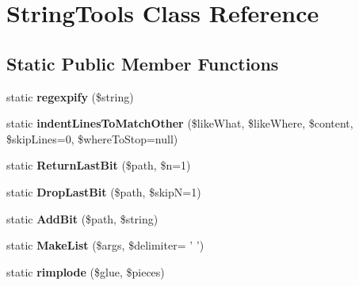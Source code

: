 \hypertarget{class_tools_1_1_string_tools}{
\section{\-String\-Tools \-Class \-Reference}
\label{class_tools_1_1_string_tools}
}
\subsection*{\-Static \-Public \-Member \-Functions}
\begin{DoxyCompactItemize}
\item 
\hypertarget{class_tools_1_1_string_tools_aba588c7c4205b677d3afd1f803d2ab4b}{
static {\bfseries regexpify} (\$string)}
\label{class_tools_1_1_string_tools_aba588c7c4205b677d3afd1f803d2ab4b}

\item 
\hypertarget{class_tools_1_1_string_tools_ae93d3bc0b3706df05cb47fff89b08e37}{
static {\bfseries indent\-Lines\-To\-Match\-Other} (\$like\-What, \$like\-Where, \$content, \$skip\-Lines=0, \$where\-To\-Stop=null)}
\label{class_tools_1_1_string_tools_ae93d3bc0b3706df05cb47fff89b08e37}

\item 
\hypertarget{class_tools_1_1_string_tools_a29d6807e1d8f4e1ee335baf0d0fd1d1b}{
static {\bfseries \-Return\-Last\-Bit} (\$path, \$n=1)}
\label{class_tools_1_1_string_tools_a29d6807e1d8f4e1ee335baf0d0fd1d1b}

\item 
\hypertarget{class_tools_1_1_string_tools_af7b82890bac23b74e75bddb69aefc560}{
static {\bfseries \-Drop\-Last\-Bit} (\$path, \$skip\-N=1)}
\label{class_tools_1_1_string_tools_af7b82890bac23b74e75bddb69aefc560}

\item 
\hypertarget{class_tools_1_1_string_tools_a418d93d393d254cb70e404fa4bba4835}{
static {\bfseries \-Add\-Bit} (\$path, \$string)}
\label{class_tools_1_1_string_tools_a418d93d393d254cb70e404fa4bba4835}

\item 
\hypertarget{class_tools_1_1_string_tools_a2dd004150fb751c66d317f69f80d88c9}{
static {\bfseries \-Make\-List} (\$args, \$delimiter= ' ')}
\label{class_tools_1_1_string_tools_a2dd004150fb751c66d317f69f80d88c9}

\item 
\hypertarget{class_tools_1_1_string_tools_a14606dd28796f49ba6123a9b57963376}{
static {\bfseries rimplode} (\$glue, \$pieces)}
\label{class_tools_1_1_string_tools_a14606dd28796f49ba6123a9b57963376}


\end{DoxyCompactItemize}
